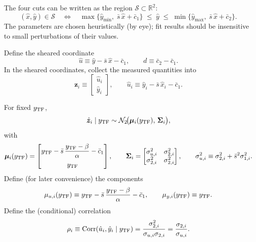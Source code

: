 The four cuts can be written as the region $\mathcal S\subset\mathbb R^2$:
\begin{equation}
(\hat x,\hat y)\in\mathcal S
\quad \Longleftrightarrow \quad
\max\!\bigl\{\hat y_{\min},\;\bar{s}\,\hat x+\bar{c}_1\bigr\}
\;\le\;
\hat y
\;\le\;
\min\!\bigl\{\hat y_{\max},\;\bar{s}\,\hat x+\bar{c}_2\bigr\}.
\end{equation}
The parameters are chosen heuristically (by eye); fit results should be insensitive to small perturbations of their values.

Define the sheared coordinate
\begin{equation}
\hat u \equiv \hat y-\bar{s}\,\hat x-\bar{c}_1,
\qquad
d \equiv \bar{c}_2-\bar{c}_1.
\end{equation}
In the sheared coordinates, collect the measured quantities into
\begin{equation}
\hat{\boldsymbol z}_i \equiv
\begin{bmatrix}\hat u_i\\ \hat y_i\end{bmatrix},
\qquad
\hat u_i \equiv \hat y_i-\bar s\,\hat x_i-\bar c_1.
\end{equation}

For fixed $y_{\rm TF}$,
\begin{equation}
\hat{\boldsymbol z}_i \mid y_{\rm TF} \sim
\mathcal N_2\!\bigl(\boldsymbol\mu_i(y_{\rm TF}),\,\boldsymbol\Sigma_i\bigr),
\end{equation}
with
\begin{equation}
\boldsymbol\mu_i(y_{\rm TF})
=
\begin{bmatrix}
y_{\mathrm{TF}}-\bar s\,\dfrac{y_{\mathrm{TF}}-\beta}{\alpha}-\bar c_1\\[8pt]
y_{\mathrm{TF}}
\end{bmatrix},
\qquad
\boldsymbol\Sigma_i
=
\begin{bmatrix}
\sigma_{u,i}^2 & \sigma_{2,i}^2\\
\sigma_{2,i}^2 & \sigma_{2,i}^2
\end{bmatrix},
\qquad
\sigma_{u,i}^2 \equiv \sigma_{2,i}^2+\bar s^2\sigma_{1,i}^2.
\end{equation}
Define (for later convenience) the components
\begin{equation}
\mu_{u,i}(y_{\rm TF}) \equiv y_{\mathrm{TF}}-\bar s\,\frac{y_{\mathrm{TF}}-\beta}{\alpha}-\bar c_1,
\qquad
\mu_{y,i}(y_{\rm TF}) \equiv y_{\mathrm{TF}}.
\end{equation}
Define the (conditional) correlation
\begin{equation}
\rho_i \equiv \mathrm{Corr}(\hat u_i,\hat y_i \mid y_{\rm TF})
=\frac{\sigma_{2,i}^2}{\sigma_{u,i}\sigma_{2,i}}
=\frac{\sigma_{2,i}}{\sigma_{u,i}}.
\end{equation}


